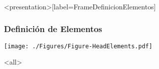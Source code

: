 
\begin{frame}<presentation>[label=FrameDefinicionElementos]
  \frametitle{Definición de Elementos}
  \texttt{[image: ./Figures/Figure-HeadElements.pdf]}
\end{frame}

\mode<all>

